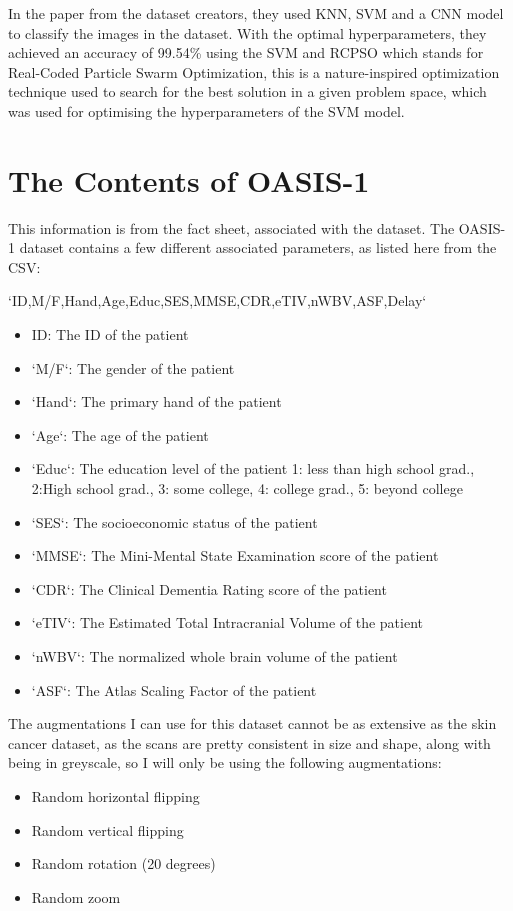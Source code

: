 \documentclass[]{final_report}
\begin{document}
In the paper from the dataset creators, they used KNN, SVM and a CNN model to classify the images in the dataset.
With the optimal hyperparameters, they achieved an accuracy of 99.54\% using the SVM and RCPSO which stands for Real-Coded Particle Swarm Optimization, this is a nature-inspired optimization technique used to search for the best solution in a given problem space, which was used for optimising the hyperparameters of the SVM model.

\section{The Contents of OASIS-1}
This information is from the fact sheet, associated with the dataset. \cite{OASISFactSheet}
The OASIS-1 dataset contains a few different associated parameters, as listed here from the CSV:

`ID,M/F,Hand,Age,Educ,SES,MMSE,CDR,eTIV,nWBV,ASF,Delay`

\begin{itemize}
  \item ID: The ID of the patient
  \item `M/F`: The gender of the patient
  \item `Hand`: The primary hand of the patient
  \item `Age`: The age of the patient
  \item `Educ`: The education level of the patient 1: less than high school grad., 2:High school grad., 3: some college, 4: college grad., 5: beyond college
  \item `SES`: The socioeconomic status of the patient
  \item `MMSE`: The Mini-Mental State Examination score of the patient
  \item `CDR`: The Clinical Dementia Rating score of the patient
  \item `eTIV`: The Estimated Total Intracranial Volume of the patient
  \item `nWBV`: The normalized whole brain volume of the patient
  \item `ASF`: The Atlas Scaling Factor of the patient
\end{itemize}

The augmentations I can use for this dataset cannot be as extensive as the skin cancer dataset, as the scans are pretty consistent in size and shape, along with being in greyscale, so I will only be using the following augmentations:
\begin{itemize}
  \item Random horizontal flipping
  \item Random vertical flipping
  \item Random rotation (20 degrees)
  \item Random zoom
\end{itemize}
\end{document}
